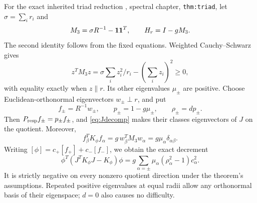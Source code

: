 For the exact inherited triad reduction \cite{nrg}, spectral chapter, \texttt{thm:triad}, let \(\sigma=\sum_i r_i\) and
\begin{equation}
M_3=\sigma R^{-1}-\mathbf1\mathbf1^T,\qquad H_r=I-gM_3.
\label{eq:M3}
\end{equation}
The second identity follows from the fixed equations. Weighted Cauchy--Schwarz gives
\[
z^TM_3z=\sigma\sum_i z_i^2/r_i-(\sum_i z_i)^2\ge0,
\]
with equality exactly when \(z\parallel r\). Its other eigenvalues \(\mu_\pm\) are positive. Choose Euclidean-orthonormal eigenvectors \(w_\pm\perp r\), and put
\begin{equation}
f_\pm=R^{-1}w_\pm,\qquad
p_\pm=1-g\mu_\pm,\qquad
\rho_\pm=dp_\pm.
\label{eq:quotientspectrum}
\end{equation}
Then \(P_{\rm resp}f_\pm=p_\pm f_\pm\), and \eqref{eq:Jdecomp} makes their classes eigenvectors of \(J\) on the quotient. Moreover,
\begin{equation}
f_\beta^TK_\phi f_\alpha
=g\,w_\beta^TM_3w_\alpha
=g\mu_\alpha\delta_{\alpha\beta}.
\label{eq:Korthogonal}
\end{equation}
Writing \([\phi]=c_+[f_+]+c_-[f_-]\), we obtain the exact decrement
\begin{equation}
\boxed{\phi^T(J^TK_\phi J-K_\phi)\phi
=g\sum_{\alpha=\pm}\mu_\alpha(\rho_\alpha^2-1)c_\alpha^2.}
\label{eq:phasedecrement}
\end{equation}
It is strictly negative on every nonzero quotient direction under the theorem's assumptions. Repeated positive eigenvalues at equal radii allow any orthonormal basis of their eigenspace; \(d=0\) also causes no difficulty.


